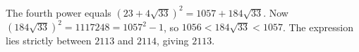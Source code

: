 The fourth power equals $(23+4\sqrt{33})^2=1057+184\sqrt{33}$. Now $(184\sqrt{33})^2=1117248=1057^2-1$, so $1056<184\sqrt{33}<1057$. The expression lies strictly between $2113$ and $2114$, giving $\boxed{2113}$.
